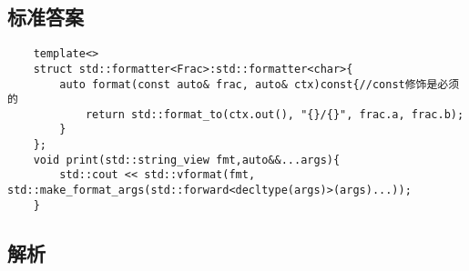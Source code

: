 

\subsection{标准答案}

\begin{verbatim}
    template<>
    struct std::formatter<Frac>:std::formatter<char>{
        auto format(const auto& frac, auto& ctx)const{//const修饰是必须的
            return std::format_to(ctx.out(), "{}/{}", frac.a, frac.b);
        }
    };
    void print(std::string_view fmt,auto&&...args){
        std::cout << std::vformat(fmt, std::make_format_args(std::forward<decltype(args)>(args)...));
    }
\end{verbatim}

\subsection{解析}

\clearpage
